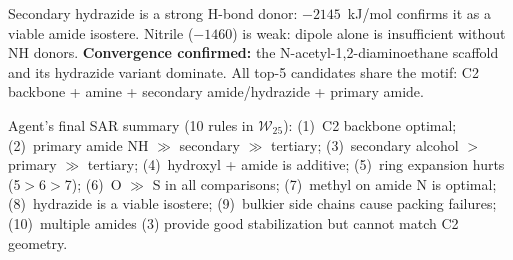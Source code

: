 \documentclass[twocolumn]{fairmeta}
\begin{document}
\begin{observation}
\scriptsize
Secondary hydrazide is a strong H-bond donor: $-2145$~kJ/mol confirms it as a viable amide isostere.
Nitrile ($-1460$) is weak: dipole alone is insufficient without NH donors.
\textbf{Convergence confirmed:} the N-acetyl-1,2-diaminoethane scaffold and its hydrazide variant dominate.
All top-5 candidates share the motif: C2 backbone + amine + secondary amide/hydrazide + primary amide.

Agent's final SAR summary (10 rules in $\mathcal{W}_{25}$): (1)~C2 backbone optimal; (2)~primary amide NH $\gg$ secondary $\gg$ tertiary; (3)~secondary alcohol $>$ primary $\gg$ tertiary; (4)~hydroxyl + amide is additive; (5)~ring expansion hurts (5$>$6$>$7); (6)~O $\gg$ S in all comparisons; (7)~methyl on amide N is optimal; (8)~hydrazide is a viable isostere; (9)~bulkier side chains cause packing failures; (10)~multiple amides (3) provide good stabilization but cannot match C2 geometry.
\end{observation}
\end{document}
